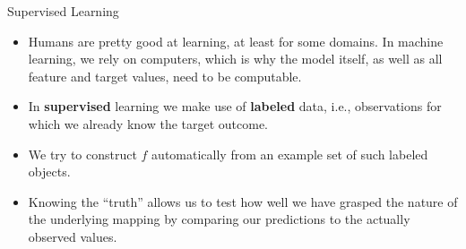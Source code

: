 \documentclass[11pt,compress,t,notes=noshow, xcolor=table]{beamer}
\begin{document}
\begin{vbframe}{Supervised Learning}

\begin{itemize}

  \item Humans are pretty good at learning, at least for some domains. In 
  machine learning, we rely on computers, which is why the model itself, as well
  as all feature and target values, need to be computable.

  \item In \textbf{supervised} learning we make use of \textbf{labeled}
  data, i.e., observations for which we already know the target outcome.
  
  \item We try to construct $f$ automatically from an example set of such 
  labeled objects.
  
  \item Knowing the \enquote{truth} allows us to test how well we have grasped 
  the nature of the underlying mapping by comparing our predictions to the 
  actually observed values.
  
  
\end{itemize} 

\end{vbframe}

\end{document}
